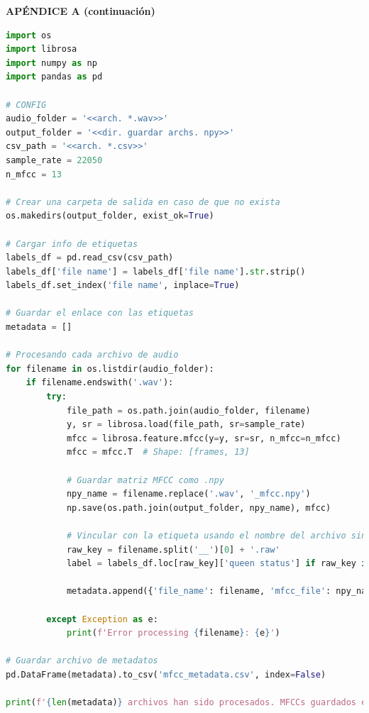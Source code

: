 \documentclass[12pt]{report}
\begin{document}
\pagebreak
\begin{center}
\large\textbf{APÉNDICE A (continuación)}
\end{center}

\begin{lstlisting}[language=Python, caption={Extracción de características.}, label={lst:FE_wavtonpy}]
import os
import librosa
import numpy as np
import pandas as pd

# CONFIG
audio_folder = '<<arch. *.wav>>'
output_folder = '<<dir. guardar archs. npy>>'
csv_path = '<<arch. *.csv>>'
sample_rate = 22050
n_mfcc = 13

# Crear una carpeta de salida en caso de que no exista
os.makedirs(output_folder, exist_ok=True)

# Cargar info de etiquetas
labels_df = pd.read_csv(csv_path)
labels_df['file name'] = labels_df['file name'].str.strip()
labels_df.set_index('file name', inplace=True)

# Guardar el enlace con las etiquetas
metadata = []

# Procesando cada archivo de audio
for filename in os.listdir(audio_folder):
    if filename.endswith('.wav'):
        try:
            file_path = os.path.join(audio_folder, filename)
            y, sr = librosa.load(file_path, sr=sample_rate)
            mfcc = librosa.feature.mfcc(y=y, sr=sr, n_mfcc=n_mfcc)
            mfcc = mfcc.T  # Shape: [frames, 13]

            # Guardar matriz MFCC como .npy
            npy_name = filename.replace('.wav', '_mfcc.npy')
            np.save(os.path.join(output_folder, npy_name), mfcc)

			# Vincular con la etiqueta usando el nombre del archivo sin el segmento
            raw_key = filename.split('__')[0] + '.raw'
            label = labels_df.loc[raw_key]['queen status'] if raw_key in labels_df.index else None

            metadata.append({'file_name': filename, 'mfcc_file': npy_name, 'queen_status': label})

        except Exception as e:
            print(f'Error processing {filename}: {e}')

# Guardar archivo de metadatos
pd.DataFrame(metadata).to_csv('mfcc_metadata.csv', index=False)

print(f'{len(metadata)} archivos han sido procesados. MFCCs guardados en '{output_folder}'')
\end{lstlisting}
\end{document}
